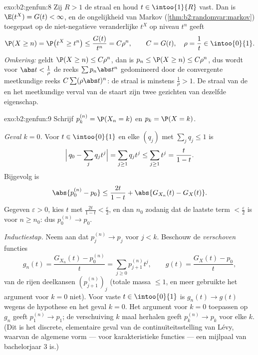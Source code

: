\begin{solution}{exo:b2:genfun:8}
Zij $R > 1$ de straal en houd $t \in \intoo{1}{R}$ vast. Dan is
$\E(t^X) = G(t) < \infty$, en de ongelijkheid van Markov
(\cref{thm:b2:randomvar:markov}) toegepast op de niet-negatieve
veranderlijke $t^X$ op niveau $t^n$ geeft
\[
\P(X \geq n) = \P\bigl(t^X \geq t^n\bigr)
\leq \frac{G(t)}{t^n} = C\rho^n,
\qquad C = G(t),\quad \rho = \frac1t \in \intoo{0}{1}.
\]
\emph{Omkering:} geldt $\P(X \geq n) \leq C\rho^n$, dan is $p_n
\leq \P(X \geq n) \leq C\rho^n$, dus wordt voor $\abs t <
\frac1\rho$ de reeks $\sum p_n\abs t^n$ gedomineerd door de
convergente meetkundige reeks $C\sum(\rho\abs t)^n$: de straal is
minstens $\frac1\rho > 1$. De straal van de  en
het meetkundige verval van de staart zijn twee gezichten van
dezelfde eigenschap.
\end{solution}

\begin{solution}{exo:b2:genfun:9}
Schrijf $p_k^{(n)} = \P(X_n = k)$ en $p_k = \P(X = k)$.

\emph{Geval $k = 0$.} Voor $t \in \intoo{0}{1}$ en elke 
$(q_j)$ met $\sum_j q_j \leq 1$ is
\[
\Bigl|\,q_0 - \sum_j q_jt^j\Bigr|
= \sum_{j \geq 1} q_j t^j
\leq \sum_{j\geq1}t^j = \frac{t}{1 - t} .
\]
Bijgevolg is
\[
\abs{p_0^{(n)} - p_0}
\leq \frac{2t}{1 - t}
+ \abs{G_{X_n}(t) - G_X(t)} .
\]
Gegeven $\varepsilon > 0$, kies $t$ met $\frac{2t}{1-t} <
\frac\varepsilon2$, en dan $n_0$ zodanig dat de laatste term $<
\frac\varepsilon2$ is voor $n \geq n_0$: dus $p_0^{(n)} \to p_0$.

\emph{Inductiestap.} Neem aan dat $p_j^{(n)} \to p_j$ voor $j < k$.
Beschouw de \emph{verschoven} functies
\[
g_n(t) = \frac{G_{X_n}(t) - p^{(n)}_0}{t}
= \sum_{j\geq0} p^{(n)}_{j+1}t^j,
\qquad
g(t) = \frac{G_X(t) - p_0}{t} ,
\]
 van de rijen deelkansen $(p^{(n)}_{j+1})_j$
(totale massa $\leq 1$, en meer gebruikte het argument voor $k = 0$
niet). Voor vaste $t \in \intoo{0}{1}$ is $g_n(t) \to g(t)$ wegens
de hypothese en het geval $k = 0$. Het argument voor $k = 0$
toepassen op $g_n$ geeft $p_1^{(n)} \to p_1$; de verschuiving $k$
maal herhalen geeft $p_k^{(n)} \to p_k$ voor elke $k$. (Dit is het
discrete, elementaire geval van de continuïteitsstelling van Lévy,
waarvan de algemene vorm --- voor karakteristieke functies --- een
mijlpaal van bachelorjaar 3 is.)
\end{solution}

